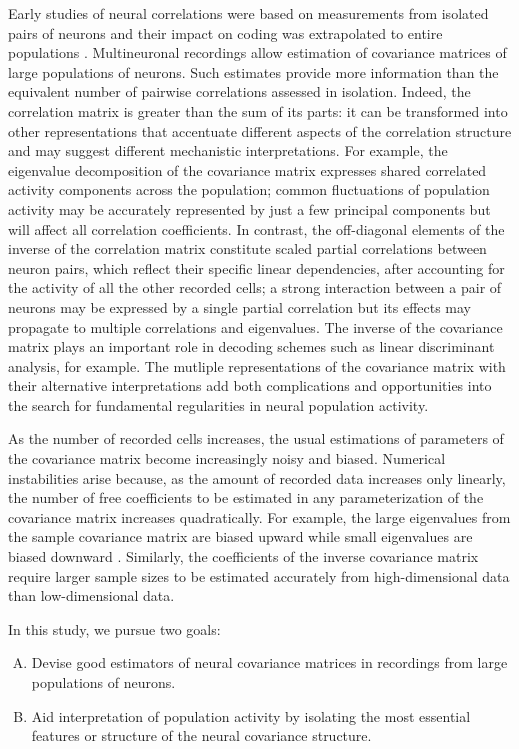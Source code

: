 Early studies of neural correlations were based on measurements from isolated pairs of neurons and their impact on coding was extrapolated to entire populations \citep{Shadlen:1998,Zohary:1994}.  Multineuronal recordings allow estimation of covariance matrices of large populations of neurons.  Such estimates provide more information than the equivalent number of pairwise correlations assessed in isolation. Indeed, the correlation matrix is greater than the sum of its parts: it can be transformed into other representations that accentuate different aspects of the correlation structure and may suggest different mechanistic interpretations. For example, the eigenvalue decomposition of the covariance matrix expresses shared correlated activity components across the population; common fluctuations of population activity may be accurately represented by just a few principal components but will affect all correlation coefficients. In contrast, the off-diagonal elements of the inverse of the correlation matrix constitute scaled partial correlations between neuron pairs, which reflect their specific linear dependencies, after accounting for the activity of all the other recorded cells; a strong interaction between a pair of neurons may be expressed by a single partial correlation but its effects may propagate to multiple correlations and eigenvalues.   The inverse of the covariance matrix plays an important role in decoding schemes such as linear discriminant analysis, for example.  The mutliple  representations of the covariance matrix with their alternative interpretations add both complications and opportunities into the search for fundamental regularities in neural population activity. 

As the number of recorded cells increases, the usual estimations of parameters of the covariance matrix become increasingly noisy and biased. Numerical instabilities arise because, as the amount of recorded data increases only linearly, the number of free coefficients to be estimated in any parameterization of the covariance matrix increases quadratically. 
For example, the large eigenvalues from the sample covariance matrix are biased upward while small eigenvalues are biased downward \citep{Hayes:1981}. Similarly, the coefficients of the inverse covariance matrix require larger sample sizes to be estimated accurately from high-dimensional data than low-dimensional data.

In this study, we pursue two goals: 
\begin{enumerate}[A.\;\;]
	\item Devise good estimators of neural covariance matrices in recordings from large populations of neurons.
	\item Aid interpretation of population activity  by isolating the most essential features or structure of the neural covariance structure.
\end{enumerate}

